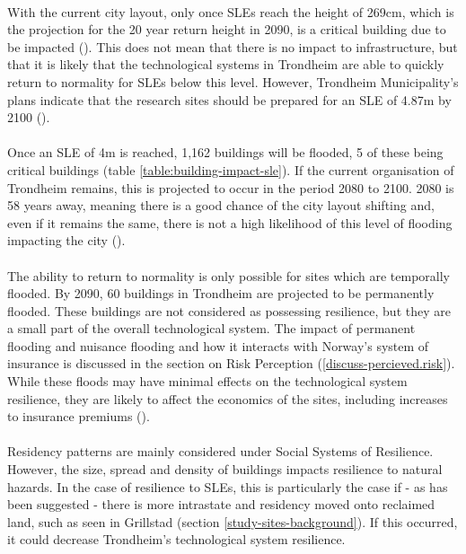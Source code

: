 \paragraph{}

With the current city layout, only once SLEs reach the height of 269cm, which is the projection for the 20 year return height in 2090, is a critical building due to be impacted (\cite{kartverket_se_2021}). This does not mean that there is no impact to infrastructure, but that it is likely that the technological systems in Trondheim are able to quickly return to normality for SLEs below this level. However, Trondheim Municipality's plans indicate that the research sites should be prepared for an SLE  of 4.87m by 2100 (\cite{hanssen_saksframlegg_2013}).
\paragraph{}
Once an SLE of 4m is reached, 1,162 buildings will be flooded, 5 of these being critical buildings (table \ref{table:building-impact-sle}). If the current organisation of Trondheim remains, this is projected to occur in the period 2080 to 2100. 2080 is 58 years away, meaning there is a good chance of the city layout shifting and, even if it remains the same, there is not a high likelihood of this level of flooding impacting the city (\cite{kartverket_se_2021}).  
\paragraph{}
The ability to return to normality is only possible for sites which are temporally flooded. By 2090, 60 buildings in Trondheim are projected to be permanently flooded. These buildings are not considered as possessing resilience, but they are a small part of the overall technological system. The impact of permanent flooding and nuisance flooding and how it interacts with Norway's system of insurance is discussed in the section on Risk Perception (\ref{discuss-percieved.risk}). While these floods may have minimal effects on the technological system resilience, they are likely to affect the economics of the sites, including increases to insurance premiums (\cite{cutter_community_2020}). 
\paragraph{}
Residency patterns are mainly considered under Social Systems of Resilience. However, the size, spread and density of buildings impacts resilience to natural hazards. In the case of resilience to SLEs, this is particularly the case if - as has been suggested - there is more intrastate and residency moved onto reclaimed land, such as seen in Grillstad (section \ref{study-sites-background}). If this occurred, it could decrease Trondheim's technological system resilience.
